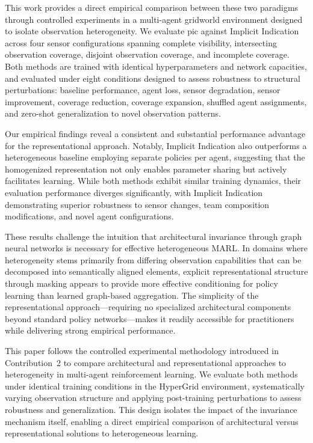 \documentclass[conference]{IEEEtran}
\begin{document}
This work provides a direct empirical comparison between these two paradigms 
through controlled experiments in a multi-agent gridworld environment designed 
to isolate observation heterogeneity. 
We evaluate \gls{pic} against Implicit Indication across four sensor configurations 
spanning complete visibility, intersecting observation coverage, disjoint observation coverage, 
and incomplete coverage. 
Both methods are trained with identical hyperparameters and network capacities, 
and evaluated under eight conditions designed to assess robustness to structural perturbations: 
baseline performance, agent loss, sensor degradation, sensor improvement, coverage reduction, 
coverage expansion, shuffled agent assignments, 
and zero-shot generalization to novel observation patterns.

Our empirical findings reveal a consistent and substantial performance advantage for 
the representational approach. 
Notably, Implicit Indication also outperforms a heterogeneous baseline employing 
separate policies per agent, suggesting that the homogenized representation not 
only enables parameter sharing but actively facilitates learning. 
While both methods exhibit similar training dynamics, 
their evaluation performance diverges significantly, 
with Implicit Indication demonstrating superior robustness to sensor changes, 
team composition modifications, and novel agent configurations.

These results challenge the intuition that architectural invariance 
through graph neural networks is necessary for effective heterogeneous MARL. 
In domains where heterogeneity stems primarily from differing observation 
capabilities that can be decomposed into semantically aligned elements, 
explicit representational structure through masking appears to provide 
more effective conditioning for policy learning than learned graph-based aggregation. 
The simplicity of the representational approach—requiring no specialized architectural 
components beyond standard policy networks—makes it readily accessible for 
practitioners while delivering strong empirical performance.

This paper follows the controlled experimental methodology introduced 
in Contribution~2%
to compare architectural and representational 
approaches to heterogeneity in multi-agent reinforcement learning. 
We evaluate both methods under identical training conditions in the 
HyperGrid environment, systematically varying observation structure and 
applying post-training perturbations to assess robustness and generalization. 
This design isolates the impact of the invariance mechanism itself, 
enabling a direct empirical comparison of architectural versus 
representational solutions to heterogeneous learning.
\end{document}
